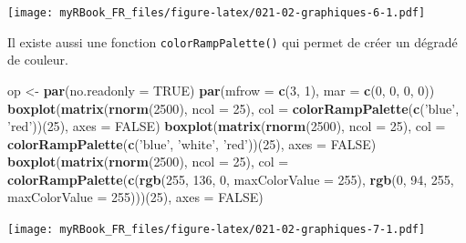 \documentclass[
]{book}
\newenvironment{Shaded}{\begin{snugshade}}{\end{snugshade}}
\newcommand{\DataTypeTok}[1]{\textcolor[rgb]{0.13,0.29,0.53}{#1}}
\newcommand{\DecValTok}[1]{\textcolor[rgb]{0.00,0.00,0.81}{#1}}
\newcommand{\KeywordTok}[1]{\textcolor[rgb]{0.13,0.29,0.53}{\textbf{#1}}}
\newcommand{\NormalTok}[1]{#1}
\newcommand{\OtherTok}[1]{\textcolor[rgb]{0.56,0.35,0.01}{#1}}
\newcommand{\StringTok}[1]{\textcolor[rgb]{0.31,0.60,0.02}{#1}}
\begin{document}
\texttt{[image: myRBook\_FR\_files/figure-latex/021-02-graphiques-6-1.pdf]}

Il existe aussi une fonction \texttt{colorRampPalette()} qui permet de créer un dégradé de couleur.

\begin{Shaded}
\begin{Highlighting}[]
\NormalTok{op <-}\StringTok{ }\KeywordTok{par}\NormalTok{(}\DataTypeTok{no.readonly =} \OtherTok{TRUE}\NormalTok{)}
\KeywordTok{par}\NormalTok{(}\DataTypeTok{mfrow =} \KeywordTok{c}\NormalTok{(}\DecValTok{3}\NormalTok{, }\DecValTok{1}\NormalTok{), }\DataTypeTok{mar =} \KeywordTok{c}\NormalTok{(}\DecValTok{0}\NormalTok{, }\DecValTok{0}\NormalTok{, }\DecValTok{0}\NormalTok{, }\DecValTok{0}\NormalTok{))}
\KeywordTok{boxplot}\NormalTok{(}\KeywordTok{matrix}\NormalTok{(}\KeywordTok{rnorm}\NormalTok{(}\DecValTok{2500}\NormalTok{), }\DataTypeTok{ncol =} \DecValTok{25}\NormalTok{), }
  \DataTypeTok{col =} \KeywordTok{colorRampPalette}\NormalTok{(}\KeywordTok{c}\NormalTok{(}\StringTok{'blue'}\NormalTok{, }\StringTok{'red'}\NormalTok{))(}\DecValTok{25}\NormalTok{), }\DataTypeTok{axes =} \OtherTok{FALSE}\NormalTok{)}
\KeywordTok{boxplot}\NormalTok{(}\KeywordTok{matrix}\NormalTok{(}\KeywordTok{rnorm}\NormalTok{(}\DecValTok{2500}\NormalTok{), }\DataTypeTok{ncol =} \DecValTok{25}\NormalTok{), }
  \DataTypeTok{col =} \KeywordTok{colorRampPalette}\NormalTok{(}\KeywordTok{c}\NormalTok{(}\StringTok{'blue'}\NormalTok{, }\StringTok{'white'}\NormalTok{, }\StringTok{'red'}\NormalTok{))(}\DecValTok{25}\NormalTok{), }\DataTypeTok{axes =} \OtherTok{FALSE}\NormalTok{)}
\KeywordTok{boxplot}\NormalTok{(}\KeywordTok{matrix}\NormalTok{(}\KeywordTok{rnorm}\NormalTok{(}\DecValTok{2500}\NormalTok{), }\DataTypeTok{ncol =} \DecValTok{25}\NormalTok{), }
  \DataTypeTok{col =}  \KeywordTok{colorRampPalette}\NormalTok{(}\KeywordTok{c}\NormalTok{(}\KeywordTok{rgb}\NormalTok{(}\DecValTok{255}\NormalTok{, }\DecValTok{136}\NormalTok{, }\DecValTok{0}\NormalTok{, }\DataTypeTok{maxColorValue =} \DecValTok{255}\NormalTok{),  }
  \KeywordTok{rgb}\NormalTok{(}\DecValTok{0}\NormalTok{, }\DecValTok{94}\NormalTok{, }\DecValTok{255}\NormalTok{, }\DataTypeTok{maxColorValue =} \DecValTok{255}\NormalTok{)))(}\DecValTok{25}\NormalTok{), }\DataTypeTok{axes =} \OtherTok{FALSE}\NormalTok{)}
\end{Highlighting}
\end{Shaded}

\texttt{[image: myRBook\_FR\_files/figure-latex/021-02-graphiques-7-1.pdf]}
\end{document}
